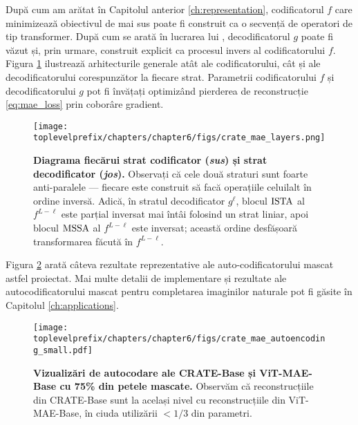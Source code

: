 \documentclass[../../book-main_ro.tex]{subfiles}
\begin{document}
După cum am arătat în Capitolul anterior \ref{ch:representation},
codificatorul $f$ care minimizează obiectivul de mai sus poate fi construit ca
o secvență de operatori de tip transformer. După cum se arată în lucrarea lui
\cite{Pai2024masked}, decodificatorul $g$ poate fi văzut și, prin urmare,
construit explicit ca procesul invers al codificatorului $f$.
Figura \ref{fig:crate_mae_layers} ilustrează arhitecturile generale
atât ale codificatorului, cât și ale decodificatorului corespunzător la
fiecare strat. Parametrii codificatorului $f$ și decodificatorului $g$ pot fi
învățați optimizând pierderea de reconstrucție \eqref{eq:mae_loss} prin
coborâre gradient.

\begin{figure}[t!]
\centering
\texttt{[image: \\toplevelprefix/chapters/chapter6/figs/crate\_mae\_layers.png]}
\caption{\small \textbf{Diagrama fiecărui strat codificator
  (\textit{sus}) și strat decodificator (\textit{jos}).} Observați că
  cele două straturi sunt foarte anti-paralele --- fiecare este construit să
  facă operațiile celuilalt în ordine inversă. Adică, în
  stratul decodificator \(g^{\ell}\), blocul \(\operatorname{ISTA}\) al \(f^{L - \ell}\)
  este parțial inversat mai întâi folosind un strat liniar, apoi
  blocul \(\operatorname{MSSA}\) al \(f^{L - \ell}\) este inversat; această ordine
desfășoară transformarea făcută în \(f^{L - \ell}\).}
\label{fig:crate_mae_layers}
\end{figure}

Figura \ref{fig:mae_autoencoding-small} arată câteva rezultate reprezentative
ale auto-codificatorului mascat astfel proiectat. Mai multe detalii de implementare și
rezultate ale autocodificatorului mascat pentru completarea imaginilor naturale pot fi
găsite în Capitolul \ref{ch:applications}.
\begin{figure}[t]
\centering
\texttt{[image: \\toplevelprefix/chapters/chapter6/figs/crate\_mae\_autoencoding\_small.pdf]}
\caption{\small \textbf{Vizualizări de autocodare ale CRATE-Base
  și ViT-MAE-Base \cite{he2022masked} cu 75\% din petele mascate.}
  Observăm că reconstrucțiile din CRATE-Base sunt la același nivel
  cu reconstrucțiile din ViT-MAE-Base, în ciuda utilizării \(<
  1/3\) din parametri.
}
\label{fig:mae_autoencoding-small}
\end{figure}
\end{document}
